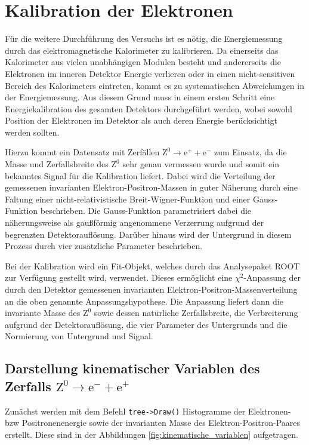 \documentclass[11pt, a4paper]{article}
\numberwithin{equation}{section}
\begin{document}
\section{Kalibration der Elektronen}
\label{sec:kalibration}

Für die weitere Durchführung des Versuchs ist es nötig, die Energiemessung durch das elektromagnetische Kalorimeter zu kalibrieren.
Da einerseits das Kalorimeter aus vielen unabhängigen Modulen besteht und andererseits die Elektronen im inneren Detektor Energie verlieren oder in einen nicht-sensitiven Bereich des Kalorimeters eintreten, kommt es zu systematischen Abweichungen in der Energiemessung.
Aus diesem Grund muss in einem ersten Schritt eine Energiekalibration des gesamten Detektors durchgeführt werden, wobei sowohl Position der Elektronen im Detektor als auch deren Energie berücksichtigt werden sollten.

Hierzu kommt ein Datensatz mit Zerfällen $\mathrm{Z}^0 \rightarrow \mathrm{e}^+ + \mathrm{e}^-$ zum Einsatz, da die Masse und Zerfallsbreite des $\mathrm{Z}^0$ sehr genau vermessen wurde und somit ein bekanntes Signal für die Kalibration liefert.
Dabei wird die Verteilung der gemessenen invarianten Elektron-Positron-Massen in guter Näherung durch eine Faltung einer nicht-relativistische Breit-Wigner-Funktion und einer Gauss-Funktion beschrieben.
Die Gauss-Funktion parametrisiert dabei die näherungsweise als gaußförmig angenommene Verzerrung aufgrund der begrenzten Detektorauflösung.
Darüber hinaus wird der Untergrund in diesem Prozess durch vier zusätzliche Parameter beschrieben.

Bei der Kalibration wird ein Fit-Objekt, welches durch das Analysepaket ROOT zur Verfügung gestellt wird, verwendet.
Dieses ermöglicht eine $\chi^2$-Anpassung der durch den Detektor gemessenen invarianten  Elektron-Positron-Massenverteilung an die oben genannte Anpassungshypothese.
Die Anpassung liefert dann die invariante Masse des $\mathrm{Z}^0$ sowie dessen natürliche Zerfallsbreite, die Verbreiterung aufgrund der Detektorauflösung, die vier Parameter des Untergrunds und die Normierung von Untergrund und Signal.

\subsection{Darstellung kinematischer Variablen des Zerfalls $\mathrm{Z}^0 \rightarrow \mathrm{e}^- + \mathrm{e}^+$}

Zunächst werden mit dem Befehl \texttt{tree->Draw()} Histogramme der Elektronen- bzw Positronenenergie sowie der invarianten Masse des Elektron-Positron-Paares erstellt.
Diese sind in der Abbildungen \ref{fig:kinematische_variablen} aufgetragen.
\end{document}
